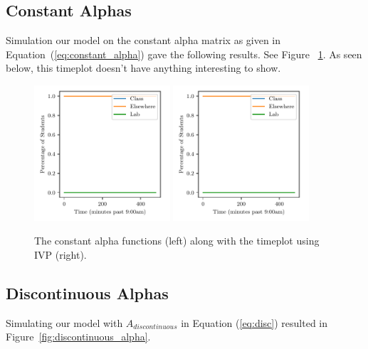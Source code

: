 \documentclass[11pt]{amsart}
\begin{document}
\subsection{Constant Alphas}
Simulation our model on the constant alpha matrix as given in Equation~(\ref{eq:constant_alpha}) gave the following results. See Figure ~\ref{fig:constant_alpha}.
As seen below, this timeplot doesn't have anything interesting to show.

\begin{figure}[htp]
    \centering
    \includegraphics[width=0.45\textwidth]{temp.pdf}\hfill
    \includegraphics[width=0.45\textwidth]{temp.pdf}\hfill
    \caption{The constant alpha functions (left) along with the timeplot using IVP (right).}
    \label{fig:constant_alpha}

\end{figure}

\subsection{Discontinuous Alphas}
Simulating our model with $A_{discontinuous}$ in Equation (\ref{eq:disc}) resulted in Figure~\ref{fig:discontinuous_alpha}. 
\end{document}
